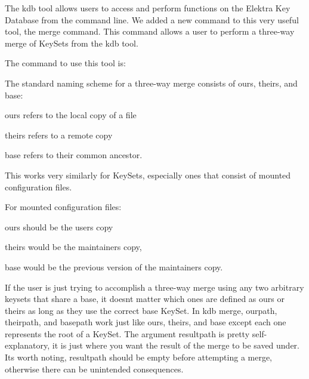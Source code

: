 The kdb tool allows users to access and perform functions on the Elektra Key Database from the command line. We added a new command to this very useful tool, the {\ttfamily merge} command. This command allows a user to perform a three-\/way merge of Key\+Sets from the {\ttfamily kdb} tool.

The command to use this tool is\+:


\begin{DoxyCode}{0}
\end{DoxyCode}


The standard naming scheme for a three-\/way merge consists of {\ttfamily ours}, {\ttfamily theirs}, and {\ttfamily base}\+:


\begin{DoxyItemize}
\item {\ttfamily ours} refers to the local copy of a file
\item {\ttfamily theirs} refers to a remote copy
\item {\ttfamily base} refers to their common ancestor.
\end{DoxyItemize}

This works very similarly for Key\+Sets, especially ones that consist of mounted configuration files.

For mounted configuration files\+:


\begin{DoxyItemize}
\item {\ttfamily ours} should be the user\textquotesingle{}s copy
\item {\ttfamily theirs} would be the maintainers copy,
\item {\ttfamily base} would be the previous version of the maintainer\textquotesingle{}s copy.
\end{DoxyItemize}

If the user is just trying to accomplish a three-\/way merge using any two arbitrary keysets that share a base, it doesn\textquotesingle{}t matter which ones are defined as {\ttfamily ours} or {\ttfamily theirs} as long as they use the correct base Key\+Set. In {\ttfamily kdb merge}, {\ttfamily ourpath}, {\ttfamily theirpath}, and {\ttfamily basepath} work just like {\ttfamily ours}, {\ttfamily theirs}, and {\ttfamily base} except each one represents the root of a Key\+Set. The argument {\ttfamily resultpath} is pretty self-\/explanatory, it is just where you want the result of the merge to be saved under. It\textquotesingle{}s worth noting, {\ttfamily resultpath} should be empty before attempting a merge, otherwise there can be unintended consequences.

